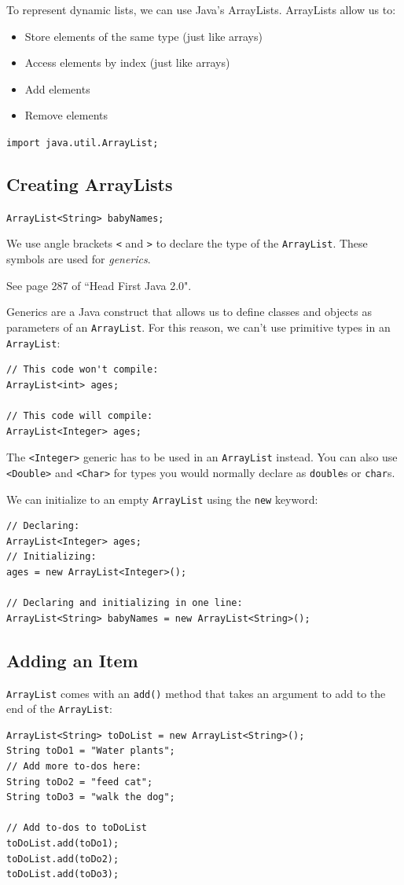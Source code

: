 \documentclass[a4paper, 12pt]{article}
\begin{document}
To represent dynamic lists, we can use Java's ArrayLists. ArrayLists allow us to:
\begin{itemize}
\item Store elements of the same type (just like arrays)

\item Access elements by index (just like arrays)

\item Add elements

\item Remove elements

\end{itemize}

\verb|import java.util.ArrayList;|

\subsection{Creating ArrayLists}
\verb|ArrayList<String> babyNames;|

We use angle brackets \verb|<| and \verb|>| to declare the type of the \verb|ArrayList|. These symbols are used for \textit{generics}.

See page 287 of ``Head First Java 2.0".

Generics are a Java construct that allows us to define classes and objects as parameters of an \verb|ArrayList|. For this reason, we can't use primitive types in an \verb|ArrayList|:
\begin{verbatim}
// This code won't compile:
ArrayList<int> ages;

// This code will compile:
ArrayList<Integer> ages;
\end{verbatim}
The \verb|<Integer>| generic has to be used in an \verb|ArrayList| instead. You can also use \verb|<Double>| and \verb|<Char>| for types you would normally declare as \verb|double|s or \verb|char|s.

We can initialize to an empty \verb|ArrayList| using the \verb|new| keyword:
\begin{verbatim}
// Declaring:
ArrayList<Integer> ages;
// Initializing:
ages = new ArrayList<Integer>();

// Declaring and initializing in one line:
ArrayList<String> babyNames = new ArrayList<String>();
\end{verbatim}


\subsection{Adding an Item}
\verb|ArrayList| comes with an \verb|add()| method that takes an argument to add to the end of the \verb|ArrayList|:
\begin{verbatim}
ArrayList<String> toDoList = new ArrayList<String>();
String toDo1 = "Water plants";
// Add more to-dos here:
String toDo2 = "feed cat";
String toDo3 = "walk the dog";

// Add to-dos to toDoList
toDoList.add(toDo1);
toDoList.add(toDo2);
toDoList.add(toDo3);
\end{verbatim}
\end{document}
